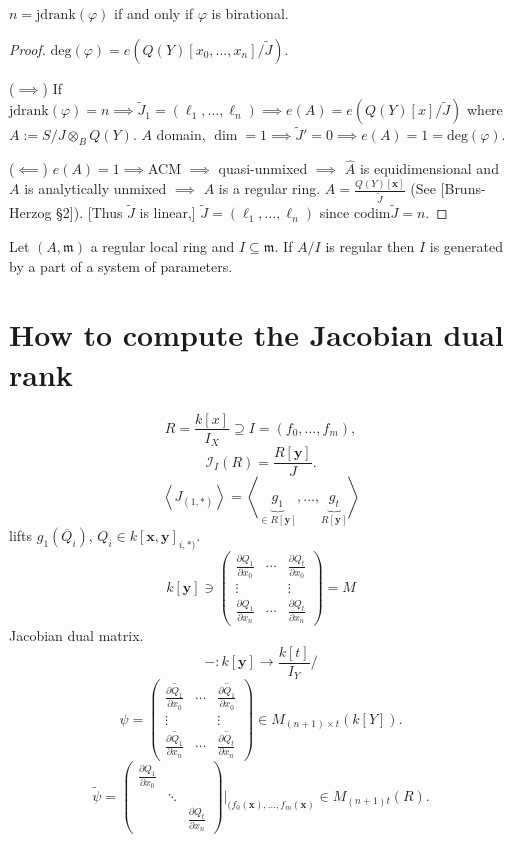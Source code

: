 \begin{theorem}
\label{theorem-jacob-rank-birat}
$n=\text{jdrank}(\varphi)$ if and only if
$\varphi$ is birational.
\end{theorem}

\begin{proof}
$\text{deg}(\varphi)=e(Q(Y)[x_0,…,x_n]/
\tilde{J})$.

($\implies$) If $\text{jdrank}(\varphi)=n
\implies
\tilde{J}_1=(\ell_1,…,\ell_n)
\implies e(A)=e(Q(Y)[x]/\tilde{J})$
where $A:=S/J\otimes_BQ(Y)$.
$A$ domain,  $\dim=1 \implies  \tilde{J}'=0
\implies e(A)=1=\text{deg}(\varphi)$.

($\impliedby$) $e(A)=1 \implies $ACM
$\implies $ quasi-unmixed
$\implies$ $\hat{A}$ is equidimensional
and $A$ is analytically unmixed
$\implies $ $A$ is a regular ring.
$A=\frac{Q(Y)[\mathbf{x}]}{\tilde{J}}$ (See
[Bruns-Herzog §2]).
[Thus $\tilde{J}$ is linear,]
$\tilde{J}=(\ell_1,…,\ell_n)$
since $\text{codim}\tilde{J}=n$.
\end{proof}

\begin{proposition}
\label{proposition-regular-local-ring}
Let $(A,\mathfrak{m})$ a regular local ring
and $I\subseteq \mathfrak{m}$.
If  $A/I$ is regular then $I$ is generated by
a part
of a system of parameters.
\end{proposition}

\section{How to compute the Jacobian dual
rank}
\label{section-computing-jacobian-dual-rank}

$$
R=\frac{k[x]}{I_X}\supseteq I=(f_0,…,f_m),
$$
$$
\mathcal{I}_I(R)=\frac{R[\mathbf{y}]}{J}.
$$
$$
\left\langle{}J_{(1,\ast)}\right\rangle{}
=\left\langle{}\underbrace{g_1}_{\in R[\mathbf{y}]},
…,\underbrace{g_t}_{R[\mathbf{y}]}\right\rangle{}
$$
lifts $g_1(\overline{Q}_i)$,
$Q_i \in k[\mathbf{x},\mathbf{y}]_{i,\ast)}$.
$$
k[\mathbf{y}]\ni
\begin{pmatrix}
\frac{\partial Q_1}{\partial x_0}& \cdots
&\frac{\partial Q_t}{\partial x_0}\\
\vdots &  &  \vdots \\
\frac{\partial Q_1}{\partial x_n}&  \cdots
&  \frac{\partial Q_t}{\partial x_n}
 \end{pmatrix}
=M
$$
Jacobian dual matrix.
$$
-:k[\mathbf{y}]\to \frac{k[t]}{I_Y}/
$$
$$
\psi=
\begin{pmatrix}
\overline{\frac{\partial Q_1}{\partial x_0}}
&  \cdots &
\overline{\frac{\partial Q_1}{\partial
x_0}}\\
\vdots &  &  \vdots \\
\overline{\frac{\partial Q_1}{\partial x_n}}
&  \cdots &
\overline{\frac{\partial Q_t}{\partial x_n}}
 \end{pmatrix}
\in M_{(n+1) \times t}(k[Y]).
$$
$$
\tilde{\psi}
=\begin{pmatrix}
\frac{\partial Q_1}{\partial x_0}    \\
&  \ddots & \\
&  &  \frac{\partial Q_t}{\partial x_n}
\end{pmatrix}
\Big|_{(f_0(\mathbf{x}),…,f_m(\mathbf{x})}
\in M_{(n+1)t}(R).
$$

